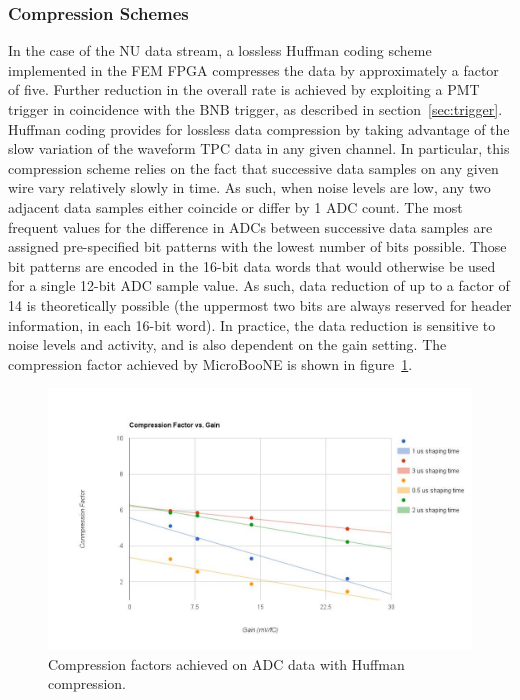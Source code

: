 

\subsubsection{Compression Schemes}
\label{sec:tpccomp}

In the case of the NU data stream, a lossless Huffman coding scheme implemented in the FEM FPGA compresses the data by approximately a factor of five. Further reduction in the overall rate is achieved by exploiting a PMT trigger in coincidence with the BNB trigger, as described in section~\ref{sec:trigger}. Huffman coding provides for lossless data compression by taking advantage of the slow variation of the waveform TPC data in any given channel. In particular, this compression scheme relies on the fact that successive data samples on any given wire vary relatively slowly in time. As such, when noise levels are low, any two adjacent data samples either coincide or differ by 1 ADC count. The most frequent values for the difference in ADCs between successive data samples are assigned pre-specified bit patterns with the lowest number of bits possible. Those bit patterns are encoded in the 16-bit data words that would otherwise be used for a single 12-bit ADC sample value. As such, data reduction of up to a factor of 14 is theoretically possible (the uppermost two bits are always reserved for header information, in each 16-bit word). In practice, the data reduction is sensitive to noise levels and \lartpc activity, and is also dependent on the gain setting. The compression factor achieved by MicroBooNE is shown in figure~\ref{fig:readout_6}.

\begin{figure}
\centering
\includegraphics[width=0.8\linewidth]{./figures/readout_6.jpg}%
\caption{\label{fig:readout_6}Compression factors achieved on ADC data with Huffman compression.}
\end{figure}

